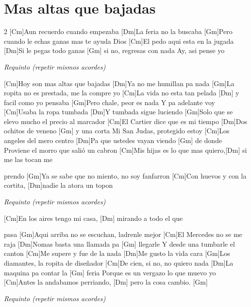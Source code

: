\section{Mas altas que bajadas}

\noindent
\vspace{1cm}

\begin{guitar}
	\begin{multicols}{2}
		[Cm]Aun recuerdo cuando empezaba
		[Dm]La feria no la buscaba
		[Gm]Pero cuando le echas ganas mas te ayuda Dios
		[Cm]El pedo aqui esta en la jugada
		[Dm]Si le pegas todo ganas [Gm] si no, regresas con nada 
		Ay, asi pense yo 

		\textit{Requinto (repetir mismos acordes)} 

		[Cm]Hoy son mas altas que bajadas
		[Dm]Ya no me humillan pa nada
		[Gm]La ropita no es prestada, me la compre yo
		[Cm]La vida no esta tan pelada [Dm] y facil como yo pensaba
		[Gm]Pero chale, peor es nada
		Y pa adelante voy
		[Cm]Usaba la ropa tumbada
		[Dm]Y tumbada sigue luciendo
		[Gm]Solo que se elevo mucho el precio al marcador
		[Cm]El Cartier dice que es mi tiempo
		[Dm]Dos ochitos de veneno [Gm] y una corta
		Mi San Judas, protegido estoy
		[Cm]Los angeles del mero centro
		[Dm]Pa que ustedes vayan viendo [Gm] de donde
		Proviene el morro que salió un cabron
		[Cm]Mis hijas es lo que mas quiero,[Dm] si me las tocan me \par prendo
		[Gm]Ya se sabe que no miento, no soy fanfarron
		[Cm]Con huevos y con la cortita, [Dm]nadie la atora un topon

		\textit{Requinto (repetir mismos acordes)} 

		[Cm]En los aires tengo mi casa, [Dm] mirando a todo el que \par pasa
		[Gm]Aqui arriba no se escuchan, ladrenle mejor
		[Cm]El Mercedes no se me raja
		[Dm]Nomas basta una llamada pa [Gm] llegarle
		Y desde una tumbarle el canton
		[Cm]Me supere y fue de la nada
		[Dm]Me gusto la vida cara
		[Gm]Los diamantes, la ropita de dise\~{n}ador
		[Cm]De cien, si no, no quiero nada
		[Dm]La maquina pa contar la [Gm] feria
		Porque es un vergazo lo que muevo yo
		[Cm]Antes la andabamos perriando, [Dm] pero la cosa cambio. [Gm]

		\textit{Requinto (repetir mismos acordes)} 

		
	\end{multicols}
\end{guitar}
